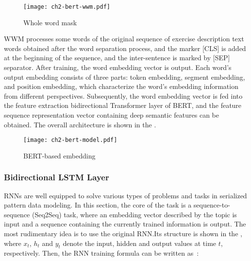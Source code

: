 \begin{figure}[htbp!]
    \centering
    \texttt{[image: ch2-bert-wwm.pdf]}
    \caption{Whole word mask}\label{fig:ch2-bert-wwm}
\end{figure}


WWM processes some words of the original sequence of exercise description text words obtained after the word separation process, and the marker [CLS] is added at the beginning of the sequence, and the inter-sentence is marked by [SEP] separator. After training, the word embedding vector is output. Each word's output embedding consists of three parts: token embedding, segment embedding, and position embedding, which characterize the word's embedding information from different perspectives. Subsequently, the word embedding vector is fed into the feature extraction bidirectional Transformer layer of BERT, and the feature sequence representation vector containing deep semantic features can be obtained. The overall architecture is shown in the \figname{\ref{fig:ch2-bert-model}}.

\begin{figure}[htb]
    \centering
    \texttt{[image: ch2-bert-model.pdf]}
    \caption{BERT-based embedding}\label{fig:ch2-bert-model}
\end{figure}

\subsubsection{Bidirectional LSTM Layer}

RNNs are well equipped to solve various types of problems and tasks in serialized pattern data modeling. In this section, the core of the task is a sequence-to-sequence (Seq2Seq) task, where an embedding vector described by the topic is input and a sequence containing the currently trained information is output. The most rudimentary idea is to use the original RNN.\@ Its structure is shown in the \figname{\ref{fig:ch2-rnn-model}}, where \(x_t\), \(h_t\) and \(y_t\) denote the input, hidden and output values at time \(t\), respectively. Then, the RNN training formula can be written as~\eqname{\ref{fml:rnn-train}}:

